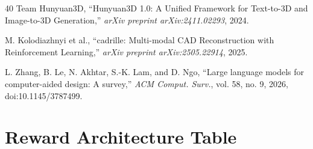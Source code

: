 \documentclass[conference]{IEEEtran}
\begin{document}
\begin{thebibliography}{40}
Team Hunyuan3D, ``Hunyuan3D 1.0: A Unified Framework for Text-to-3D and Image-to-3D Generation,'' \emph{arXiv preprint arXiv:2411.02293}, 2024.

M. Kolodiazhnyi et al., ``cadrille: Multi-modal CAD Reconstruction with Reinforcement Learning,'' \emph{arXiv preprint arXiv:2505.22914}, 2025.

L. Zhang, B. Le, N. Akhtar, S.-K. Lam, and D. Ngo, ``Large language models for computer-aided design: A survey,'' \emph{ACM Comput. Surv.}, vol. 58, no. 9, 2026, doi:10.1145/3787499.

\end{thebibliography}

\clearpage
\onecolumn
\appendices

\section{Reward Architecture Table}
\begingroup
\scriptsize
\setlength{\tabcolsep}{2pt}
\renewcommand{\arraystretch}{0.94}
\sloppy
\end{document}
